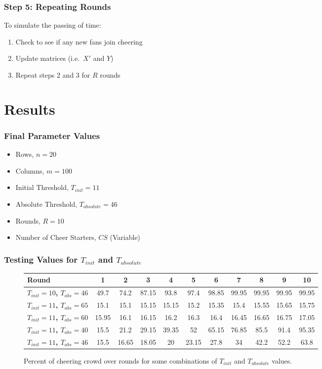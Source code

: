 \documentclass[compress,handout,10pt]{beamer}
\let\olditem\item
\renewcommand{\item}{\setlength{\itemsep}{0.5\baselineskip}\olditem}
\begin{document}
\begin{frame}
\frametitle{Step 5: Repeating Rounds}
To simulate the passing of time:
	\begin {enumerate}
		\item Check to see if any new fans join cheering
		\item Update matrices (i.e.~$X'$ and $Y$)
		\item Repeat steps 2 and 3 for $R$ rounds
	\end {enumerate}
\end{frame}

\section{Results}

\begin{frame}
	\frametitle{Final Parameter Values}
	\begin{itemize}
		\item Rows, $n=20$
		\item Columns, $m=100$
		\item Initial Threshold, $T_{init}=11$
		\item Absolute Threshold, $T_{absolute}=46$
		\item Rounds, $R=10$
		\item Number of Cheer Starters, $CS$ (Variable)
	\end{itemize}
\end{frame}

\begin{frame}
\frametitle{Testing Values for $T_{init}$ and $T_{absolute}$}
\begin{center}
\begin{figure}[h]
\begin{tiny}\begin{tabular}{|l|c|c|c|c|c|c|c|c|c|c|}
\hline
\textbf{Round}&1&2&3&4&5&6&7&8&9&10\\\hline
\textbf{$T_{init}=10$, $T_{abs}=46$}&49.7&74.2&87.15&93.8&97.4&98.85&99.95&99.95&99.95&99.95\\\hline
\textbf{$T_{init}=11$, $T_{abs}=65$}&15.1&15.1&15.15&15.15&15.2&15.35&15.4&15.55&15.65&15.75\\\hline
\textbf{$T_{init}=11$, $T_{abs}=60$}&15.95&16.1&16.15&16.2&16.3&16.4&16.45&16.65&16.75&17.05\\\hline
\textbf{$T_{init}=11$, $T_{abs}=40$}&15.5&21.2&29.15&39.35&52&65.15&76.85&85.5&91.4&95.35\\\hline
\textbf{$T_{init}=11$, $T_{abs}=46$}&15.5&16.65&18.05&20&23.15&27.8&34&42.2&52.2&63.8\\\hline
\end{tabular}
\end{tiny}
\caption{{\tiny Percent of cheering crowd over rounds for some combinations of $T_{init}$ and $T_{absolute}$ values.}}
\end{figure}
\end{center}
\end{frame}
\end{document}
